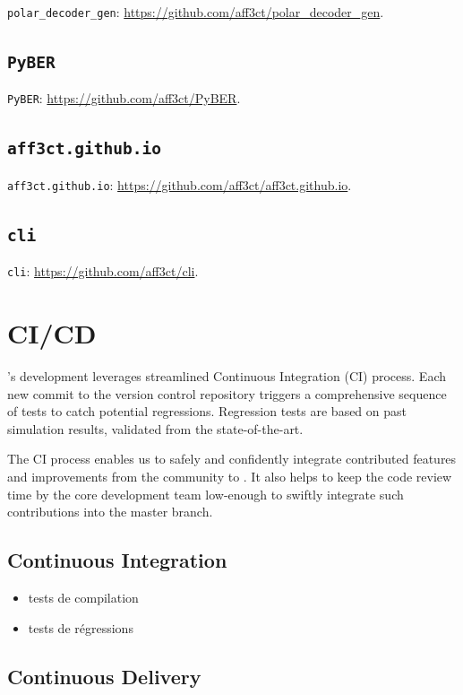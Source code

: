 \texttt{polar\_decoder\_gen}: \url{https://github.com/aff3ct/polar_decoder_gen}.

\subsection{\texttt{PyBER}}

\texttt{PyBER}: \url{https://github.com/aff3ct/PyBER}.

\subsection{\texttt{aff3ct.github.io}}

\texttt{aff3ct.github.io}: \url{https://github.com/aff3ct/aff3ct.github.io}.

\subsection{\texttt{cli}}

\texttt{cli}: \url{https://github.com/aff3ct/cli}.

\section{CI/CD}

\AFFECT's development leverages streamlined Continuous Integration (CI) process.
Each new commit to the version control repository triggers a comprehensive
sequence of tests to catch potential regressions. Regression tests are based on
past simulation results, validated from the state-of-the-art.

The CI process enables us to safely and confidently integrate contributed
features and improvements from the community to \AFFECT. It also helps to keep
the code review time by the core development team low-enough to swiftly
integrate such contributions into the master branch.

\subsection{Continuous Integration}
\begin{itemize}
  \item tests de compilation
  \item tests de régressions
\end{itemize}

\subsection{Continuous Delivery}

